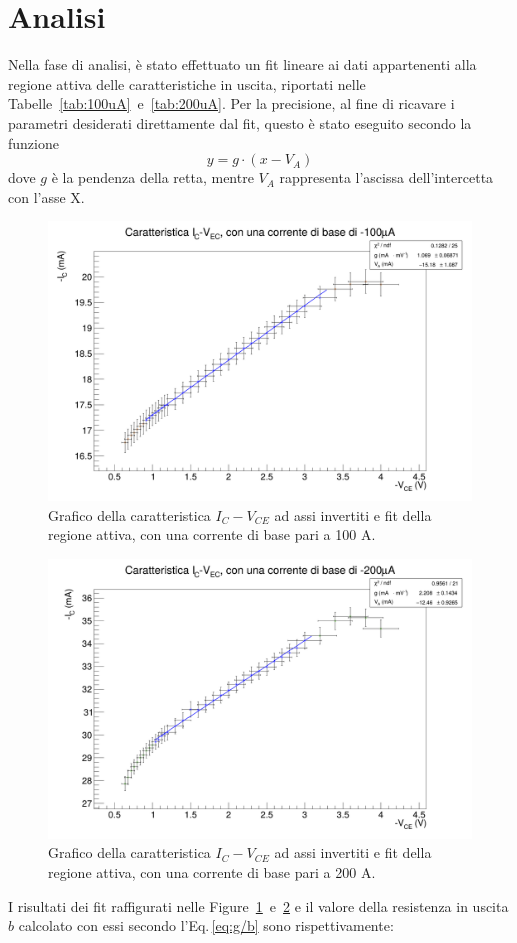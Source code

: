 \documentclass[../main.tex]{subfiles}
\begin{document}
    \section{Analisi}\label{sec:analisi}
%    
        Nella fase di analisi, è stato effettuato un fit lineare ai dati
        appartenenti alla regione attiva delle caratteristiche in
        uscita, riportati nelle
        Tabelle~\ref{tab:100uA}~e~\ref{tab:200uA}.
        Per la precisione, al fine di ricavare i parametri
        desiderati direttamente dal fit, questo è stato eseguito
        secondo la funzione
        \begin{equation*}
            y = g \cdot ( x - V_A)
        \end{equation*}
        dove $g$ è la pendenza della retta, mentre $V_A$ rappresenta
        l'ascissa dell'intercetta con l'asse X.

        \begin{figure}[h!]
            \centering
            \includegraphics[width=.69\textwidth]{../../images/caratteristica-100uA}
            \caption{
                Grafico della caratteristica $I_C - V_{CE}$ ad assi
                invertiti e fit della regione attiva, con una
                corrente di base pari a 100 \textmu A.
            }
            \label{fig:fit-100}
        \end{figure}
        \begin{figure}[h!]
            \centering
            \includegraphics[width=.69\textwidth]{../../images/caratteristica-200uA}
            \caption{
                Grafico della caratteristica $I_C - V_{CE}$ ad assi
                invertiti e fit della regione attiva, con una
                corrente di base pari a 200 \textmu A.
            }
            \label{fig:fit-200}
        \end{figure}
        I risultati dei fit raffigurati nelle
        Figure~\ref{fig:fit-100}~e~\ref{fig:fit-200} e il valore
        della resistenza in uscita $b$ calcolato con essi secondo
        l'Eq.\,\eqref{eq:g/b} sono rispettivamente:
\end{document}
